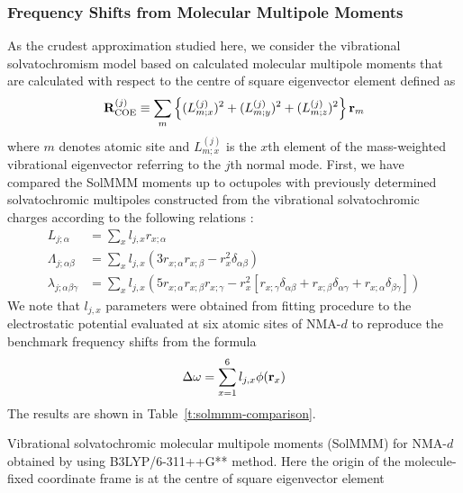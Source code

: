 \documentclass[b5paper,oneside,fleqn,11pt]{book}
\begin{document}
\begin{refsection}
\subsubsection{Frequency Shifts from Molecular Multipole Moments}

As the crudest approximation studied here, we consider 
the vibrational solvatochromism model based on calculated
molecular multipole moments that are calculated with respect to
the centre of square eigenvector element
defined as
%
\begin{equation} \label{e:coe}
 {\bf R}_{\rm COE}^{(j)} \equiv 
 \sum_m \left\{ (L^{(j)}_{m;x})^2 + (L^{(j)}_{m;y})^2 + (L^{(j)}_{m;z})^2\right\} {\bf r}_m
\end{equation}
%
where $m$ denotes atomic site and $L^{(j)}_{m;x}$ is the $x$th
element of the mass\hyp{}weighted vibrational eigenvector
referring to the $j$th normal mode.
First, we have compared the SolMMM moments up to octupoles
with previously determined solvatochromic multipoles
constructed from the vibrational solvatochromic charges
according to the following relations \citep{Lee.Choi.Cho.JCP.2012}:
%
\begin{subequations}
\begin{align}
 L_{j;\alpha}                  &= \sum_x l_{j,x} r_{x;\alpha} \\
 \Lambda_{j;\alpha\beta}       &= \sum_x l_{j,x} \left( 3r_{x;\alpha}r_{x;\beta} - r_x^2 \delta_{\alpha\beta}\right) \\
 \lambda_{j;\alpha\beta\gamma} &= \sum_x l_{j,x}\left( 5r_{x;\alpha}r_{x;\beta}r_{x;\gamma} - r_x^2 \left[
                    r_{x;\gamma}\delta_{\alpha\beta} + r_{x;\beta}\delta_{\alpha\gamma} + r_{x;\alpha}\delta_{\beta\gamma}\right]\right)
\end{align}
\end{subequations}
%
We note that $l_{j,x}$ parameters were obtained from fitting procedure
to the electrostatic potential evaluated
at six atomic sites of NMA-$d$ to reproduce the benchmark frequency shifts 
from the formula
%
\begin{equation}
 \Delta\omega = \sum_{x=1}^6 l_{j,x} \phi({\bf r}_x)
\end{equation}
%
The results are shown in Table~\ref{t:solmmm-comparison}.
%
\begin{table}[t]
\caption{
Vibrational solvatochromic molecular multipole moments (SolMMM) 
for NMA-$d$ obtained by using 
B3LYP/6-311++G** method. Here the origin
of the molecule\hyp{}fixed coordinate frame is at the centre of 
square eigenvector element
}
\end{table}
\end{refsection}
\end{document}
